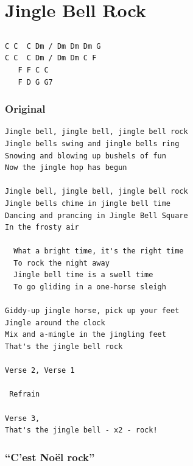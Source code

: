\documentclass[
]{article}
\begin{document}
\hypertarget{jingle-bell-rock}{%
\section{Jingle Bell Rock}\label{jingle-bell-rock}}

\hypertarget{section-13}{%
\subsection*{}\label{section-13}}

\begin{verbatim}
C C  C Dm / Dm Dm Dm G 
C C  C Dm / Dm Dm C F
   F F C C
   F D G G7
\end{verbatim}

\hypertarget{original}{%
\subsubsection{Original}\label{original}}

\begin{verbatim}
Jingle bell, jingle bell, jingle bell rock
Jingle bells swing and jingle bells ring
Snowing and blowing up bushels of fun
Now the jingle hop has begun

Jingle bell, jingle bell, jingle bell rock
Jingle bells chime in jingle bell time
Dancing and prancing in Jingle Bell Square
In the frosty air

  What a bright time, it's the right time
  To rock the night away
  Jingle bell time is a swell time
  To go gliding in a one-horse sleigh
  
Giddy-up jingle horse, pick up your feet
Jingle around the clock
Mix and a-mingle in the jingling feet
That's the jingle bell rock

Verse 2, Verse 1

 Refrain 
  
Verse 3, 
That's the jingle bell - x2 - rock!
\end{verbatim}

\hypertarget{cest-nouxebl-rock}{%
\subsubsection*{``C'est Noël rock''}\label{cest-nouxebl-rock}}
\end{document}
